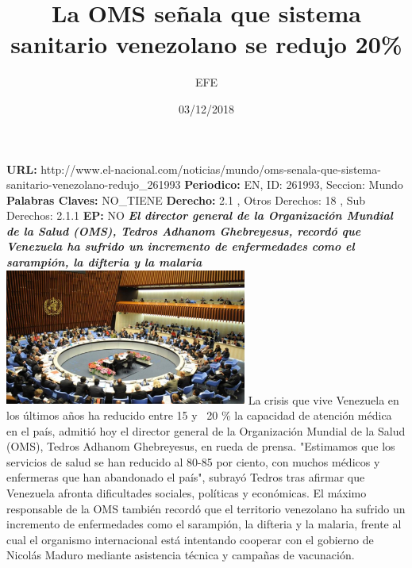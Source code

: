\documentclass{article}%
\title{\textbf{La OMS señala que sistema sanitario venezolano se redujo 20\%}}%
\author{EFE}%
\date{03/12/2018}%
\begin{document}
%
\normalsize%
\maketitle%
\textbf{URL: }%
http://www.el{-}nacional.com/noticias/mundo/oms{-}senala{-}que{-}sistema{-}sanitario{-}venezolano{-}redujo\_261993\newline%
%
\textbf{Periodico: }%
EN, %
ID: %
261993, %
Seccion: %
Mundo\newline%
%
\textbf{Palabras Claves: }%
NO\_TIENE\newline%
%
\textbf{Derecho: }%
2.1%
, Otros Derechos: %
18%
, Sub Derechos: %
2.1.1%
\newline%
%
\textbf{EP: }%
NO\newline%
\newline%
%
\textbf{\textit{El director general de la Organización Mundial de la Salud (OMS), Tedros Adhanom Ghebreyesus, recordó que Venezuela ha sufrido un incremento de enfermedades como el sarampión, la difteria y la malaria~}}%
\newline%
\newline%
%
\includegraphics[width=300px]{78.jpg}%
\newline%
%
La crisis que vive Venezuela en los últimos años ha reducido entre 15 y ~20 \% la capacidad de atención médica en el país, admitió hoy el director general de la Organización Mundial de la Salud (OMS), Tedros Adhanom Ghebreyesus, en rueda de prensa.%
\newline%
%
"Estimamos que los servicios de salud se han reducido al 80{-}85 por ciento, con muchos médicos y enfermeras que han abandonado el país", subrayó Tedros tras afirmar que Venezuela afronta dificultades sociales, políticas y económicas.%
\newline%
%
El máximo responsable de la OMS también recordó que el territorio venezolano ha sufrido un incremento de enfermedades como el sarampión, la difteria y la malaria, frente al cual el organismo internacional está intentando cooperar con el gobierno de Nicolás Maduro mediante asistencia técnica y campañas de vacunación.%
\newline%
\end{document}
